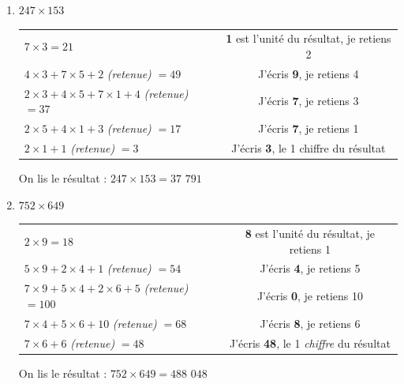 \documentclass[a4paper, twoside]{article}
\begin{document}
		\begin{small}
		\begin{enumerate}

			\item $247 \times 153$

			\begin{tabular}{l|c}

				$7 \times 3 = 21$ & \textbf{1} est l'unité du résultat, je retiens 2
				
				\tabularnewline

				$4 \times 3 + 7 \times 5 + 2$ \textit{(retenue)} $= 49$ & J'écris \textbf{9}, je retiens 4

				\tabularnewline

				$2 \times 3 + 4 \times 5 + 7 \times 1 + 4$ \textit{(retenue)} $= 37$ & J'écris \textbf{7}, je retiens 3

				\tabularnewline

				$2 \times 5 + 4 \times 1 + 3$ \textit{(retenue)} $= 17$ & J'écris \textbf{7}, je retiens 1

				\tabularnewline

				$2 \times 1 + 1$ \textit{(retenue)} $= 3$ & J'écris \textbf{3}, le 1\up{er} chiffre du résultat
				
			\end{tabular}
			
			On lis le résultat : {\boldmath $247 \times 153 = 37$ $791$}\\





			\item $752 \times 649$

			\begin{tabular}{l|c}

				$2 \times 9 = 18$ & \textbf{8} est l'unité du résultat, je retiens 1
				
				\tabularnewline

				$5 \times 9 + 2 \times 4 + 1$ \textit{(retenue)} $= 54$ & J'écris \textbf{4}, je retiens 5

				\tabularnewline

				$7 \times 9 + 5 \times 4 + 2 \times 6 + 5$ \textit{(retenue)} $= 100$ & J'écris \textbf{0}, je retiens 10

				\tabularnewline

				$7 \times 4 + 5 \times 6 + 10$ \textit{(retenue)} $= 68$ & J'écris \textbf{8}, je retiens 6

				\tabularnewline

				$7 \times 6 + 6$ \textit{(retenue)} $= 48$ & J'écris \textbf{48}, le 1\up{er} \textit{chiffre} du résultat
				
			\end{tabular}
			
			On lis le résultat : {\boldmath $752 \times 649 = 488$ $048$}\\

		\end{enumerate}
		\end{small}
\end{document}
